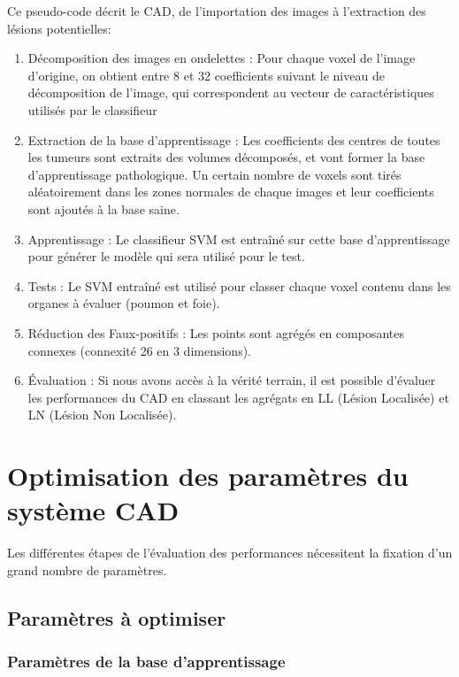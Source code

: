 Ce pseudo-code décrit le CAD, de l'importation des images à l'extraction des lésions potentielles:

\begin{enumerate}
 \item Décomposition des images en ondelettes : Pour chaque voxel de l'image d'origine, on obtient entre 8 et 32 coefficients suivant le niveau de décomposition de l'image, qui correspondent au vecteur de caractéristiques utilisés par le classifieur
 \item Extraction de la base d'apprentissage : Les coefficients des centres de toutes les tumeurs sont extraits des volumes décomposés, et vont former la base d'apprentissage pathologique. Un certain nombre de voxels sont tirés aléatoirement dans les zones normales de chaque images et leur coefficients sont ajoutés à la base saine.
 \item Apprentissage : Le classifieur SVM est entraîné sur cette base d'apprentissage pour générer le modèle qui sera utilisé pour le test.
 \item Tests : Le SVM entraîné est utilisé pour classer chaque voxel contenu dans les organes à évaluer (poumon et foie).
 \item Réduction des Faux-positifs : Les points sont agrégés en composantes connexes (connexité 26 en 3 dimensions).
 \item Évaluation : Si nous avons accès à la vérité terrain, il est possible d'évaluer les performances du CAD en classant les agrégats en LL (Lésion Localisée) et LN (Lésion Non Localisée).
\end{enumerate}



\section{Optimisation des paramètres du système CAD} %
\label{lab:optim}

Les différentes étapes de l'évaluation des performances nécessitent la fixation d'un grand nombre de paramètres.

\subsection{Paramètres à optimiser} %


\subsubsection{Paramètres de la base d'apprentissage}

